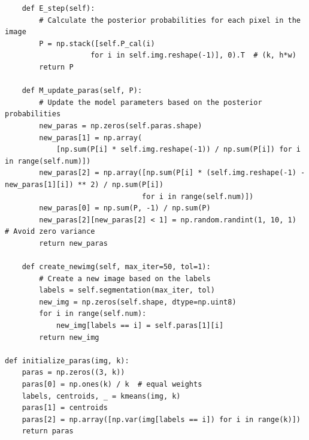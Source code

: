 \documentclass[UTF8]{ctexart}
\begin{document}
\begin{lstlisting}
    def E_step(self):
        # Calculate the posterior probabilities for each pixel in the image
        P = np.stack([self.P_cal(i)
                    for i in self.img.reshape(-1)], 0).T  # (k, h*w)
        return P

    def M_update_paras(self, P):
        # Update the model parameters based on the posterior probabilities
        new_paras = np.zeros(self.paras.shape)
        new_paras[1] = np.array(
            [np.sum(P[i] * self.img.reshape(-1)) / np.sum(P[i]) for i in range(self.num)])
        new_paras[2] = np.array([np.sum(P[i] * (self.img.reshape(-1) - new_paras[1][i]) ** 2) / np.sum(P[i])
                                for i in range(self.num)])
        new_paras[0] = np.sum(P, -1) / np.sum(P)
        new_paras[2][new_paras[2] < 1] = np.random.randint(1, 10, 1)  # Avoid zero variance
        return new_paras
    
    def create_newimg(self, max_iter=50, tol=1):
        # Create a new image based on the labels
        labels = self.segmentation(max_iter, tol)
        new_img = np.zeros(self.shape, dtype=np.uint8)
        for i in range(self.num):
            new_img[labels == i] = self.paras[1][i]
        return new_img
    
def initialize_paras(img, k):
    paras = np.zeros((3, k))
    paras[0] = np.ones(k) / k  # equal weights
    labels, centroids, _ = kmeans(img, k)
    paras[1] = centroids
    paras[2] = np.array([np.var(img[labels == i]) for i in range(k)])
    return paras
\end{lstlisting}
\end{document}
